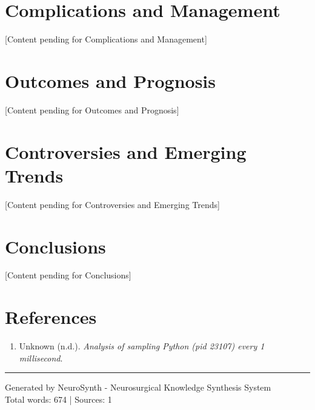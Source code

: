 \documentclass[12pt,a4paper]{article}
\begin{document}
\section{Complications and Management}




[Content pending for Complications and Management]







\section{Outcomes and Prognosis}




[Content pending for Outcomes and Prognosis]







\section{Controversies and Emerging Trends}




[Content pending for Controversies and Emerging Trends]







\section{Conclusions}




[Content pending for Conclusions]







\section*{References}
\begin{enumerate}

\item Unknown (n.d.). \textit{Analysis of sampling Python (pid 23107) every 1 millisecond}. 
      

\end{enumerate}

\vfill
\noindent\rule{\textwidth}{0.4pt}
\small
\noindent Generated by NeuroSynth - Neurosurgical Knowledge Synthesis System\\
\noindent Total words: 674 | Sources: 1
\end{document}

